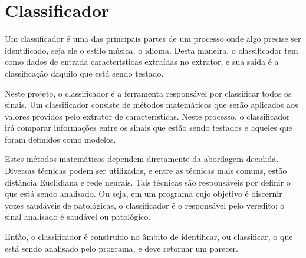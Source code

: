 \documentclass[a4paper,12pt,oneside]{report}
\begin{document}
\section{Classificador}
\hspace*{+15pt}Um classificador \'{e} uma das principais partes de um processo onde algo precise ser identificado, seja ele o estilo m\'{u}sica, o idioma. Desta maneira, o classificador tem como dados de entrada caracter\'{i}sticas extra\'{i}das no extrator, e sua sa\'{i}da \'{e} a classifica\c{c}\~{a}o daquilo que est\'{a} sendo testado. 
\\
\par Neste projeto, o classificador \'{e} a ferramenta respons\'{a}vel por classificar todos os sinais. Um classificador consiste de m\'{e}todos matem\'{a}ticos que ser\~{a}o aplicados aos valores providos pelo extrator de caracter\'{i}sticas. Neste processo, o classificador ir\'{a} comparar informa\c{c}\~{o}es entre os sinais que est\~{a}o sendo testados e aqueles que foram definidos como modelos. 
\\
\par Estes m\'{e}todos matem\'{a}ticos dependem diretamente da abordagem decidida. Diversas t\'{e}cnicas podem ser utilizadas, e entre as t\'{e}cnicas mais comuns, est\~{a}o dist\^{a}ncia Euclidiana e rede neurais. Tais t\'{e}cnicas s\~{a}o respons\'{a}veis por definir o que est\'{a} sendo analisado. Ou seja, em um programa cujo objetivo \'{e} discernir vozes saud\'{a}veis de patol\'{o}gicas, o classificador \'{e} o respons\'{a}vel pelo veredito: o sinal analisado \'{e} saud\'{a}vel ou patol\'{o}gico. 
\\
\par Ent\~{a}o, o classificador \'{e} constru\'{i}do no \^{a}mbito de identificar, ou classificar, o que est\'{a} sendo analisado pelo programa, e deve retornar um parecer. 
\end{document}
